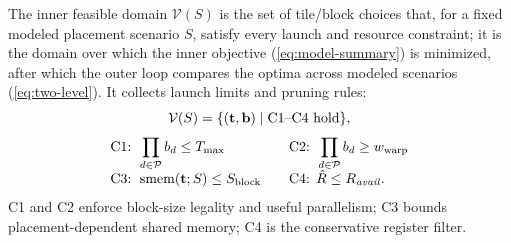 The inner feasible domain \(\mathcal{V}(S)\) is the set of tile/block choices that, for a fixed modeled placement scenario \(S\), satisfy every launch and resource constraint; it is the domain over which the inner objective (\autoref{eq:model-summary}) is minimized, after which the outer loop compares the optima across modeled scenarios (\autoref{eq:two-level}). It collects launch limits and pruning rules:
\begin{equation}
\begin{gathered}
\mathcal{V}(S)
= \{(\tvec,\mathbf{b}) \mid \text{C1--C4 hold}\},\\[0.6ex]
\begin{array}{@{}l@{\qquad}l@{}}
\text{C1: } \displaystyle \prod_{d\in\mathcal{P}} b_d \le \Tmax
&
\text{C2: } \displaystyle \prod_{d\in\mathcal{P}} b_d \ge \Wwarp\\[0.7ex]
\text{C3: } \operatorname{smem}(\tvec;S)\le \Sblock
&
\text{C4: } \hat{R}\le R_{\mathit{avail}}.
\end{array}
\end{gathered}
\label{eq:feasible-domain}
\end{equation}
C1 and C2 enforce block-size legality and useful parallelism; C3 bounds placement-dependent shared memory; C4 is the conservative register filter.

